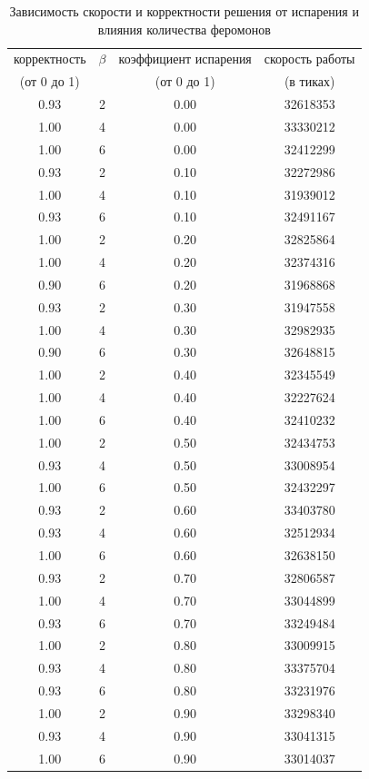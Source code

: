 \documentclass[12pt, a4paper]{report}
\begin{document}
    		\newpage
    		\begin{table}[ht!]
    			\centering
    			\begin{tabular}{ | c | c | c | c | }
    				\hline
    				корректность   &  {$\beta$}  &  коэффициент испарения  &  скорость работы \\
    				(от 0 до 1) &   & (от 0 до 1) & (в тиках) \\ \hline  
    				0.93 &  2 & 0.00 &   32618353 \\
    				1.00 &  4 & 0.00 &   33330212 \\
    				1.00 &  6 & 0.00 &   32412299 \\
    				0.93 &  2 & 0.10 &   32272986 \\
    				1.00 &  4 & 0.10 &   31939012 \\
    				0.93 &  6 & 0.10 &   32491167 \\
    				1.00 &  2 & 0.20 &   32825864 \\
    				1.00 &  4 & 0.20 &   32374316 \\
    				0.90 &  6 & 0.20 &   31968868 \\
    				0.93 &  2 & 0.30 &   31947558 \\
    				1.00 &  4 & 0.30 &   32982935 \\
    				0.90 &  6 & 0.30 &   32648815 \\
    				1.00 &  2 & 0.40 &   32345549 \\
    				1.00 &  4 & 0.40 &   32227624 \\
    				1.00 &  6 & 0.40 &   32410232 \\
    				1.00 &  2 & 0.50 &   32434753 \\
    				0.93 &  4 & 0.50 &   33008954 \\
    				1.00 &  6 & 0.50 &   32432297 \\
    				0.93 &  2 & 0.60 &   33403780 \\
    				0.93 &  4 & 0.60 &   32512934 \\
    				1.00 &  6 & 0.60 &   32638150 \\
    				0.93 &  2 & 0.70 &   32806587 \\
    				1.00 &  4 & 0.70 &   33044899 \\
    				0.93 &  6 & 0.70 &   33249484 \\
    				1.00 &  2 & 0.80 &   33009915 \\
    				0.93 &  4 & 0.80 &   33375704 \\
    				0.93 &  6 & 0.80 &   33231976 \\
    				1.00 &  2 & 0.90 &   33298340 \\
    				0.93 &  4 & 0.90 &   33041315 \\
    				1.00 &  6 & 0.90 &   33014037 \\
    				\hline
    			\end{tabular}
    			\label{tab:eva}
    			\caption{Зависимость скорости и корректности решения от испарения и влияния количества феромонов}
    			\end{table}
    			\newpage
    				
\end{document}
